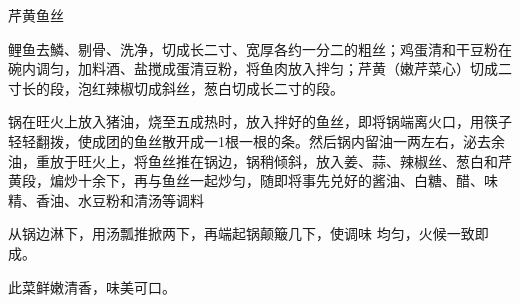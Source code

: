 \begin{recipe}{芹黄鱼丝}

\ingredients


\cooking

\step 鲤鱼去鱗、剔骨、洗净，切成长二寸、宽厚各约一分二的粗丝；鸡蛋清和干豆粉在碗内调匀，加料酒、盐搅成蛋清豆粉，将鱼肉放入拌匀；芹黄（嫩芹菜心）切成二寸长的段，泡红辣椒切成斜丝，葱白切成长二寸的段。

\step 锅在旺火上放入猪油，烧至五成热时，放入拌好的鱼丝，即将锅端离火口，用筷子轻轻翻拨，使成团的鱼丝散开成一1根一根的条。然后锅内留油一两左右，泌去余油，重放于旺火上，将鱼丝推在锅边，锅稍倾斜，放入姜、蒜、辣椒丝、葱白和芹黄段，煸炒十余下，再与鱼丝一起炒匀，随即将事先兑好的酱油、白糖、醋、味精、香油、水豆粉和清汤等调料

从锅边淋下，用汤瓢推掀两下，再端起锅颠簸几下，使调味 均匀，火候一致即成。

\notes

此菜鲜嫩清香，味美可口。

\end{recipe}

